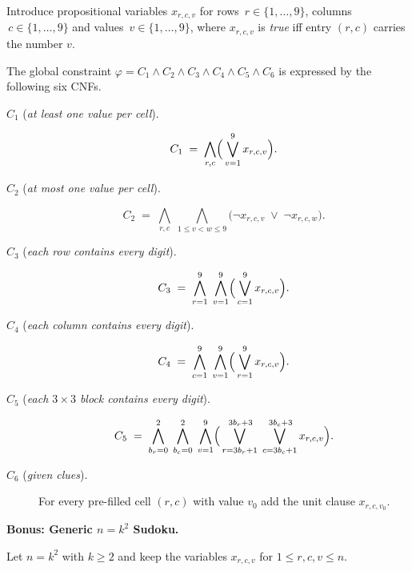 \documentclass{article}
\theoremstyle{theorem}
\theoremstyle{definition}
\theoremstyle{remark}
\begin{document}
Introduce propositional variables $x_{r,c,v}$ for rows $\,r\in\{1,\dots,9\}$,
columns $\,c\in\{1,\dots,9\}$ and values $\,v\in\{1,\dots,9\}$, where
$x_{r,c,v}$ is \emph{true} iff entry $(r,c)$ carries the number $v$.

The global constraint
$\varphi = C_1 \land C_2 \land C_3 \land C_4 \land C_5 \land C_6$
is expressed by the following six CNFs.

\begin{description}
  \item[$C_1$ (\emph{at least one value per cell}).]
        \[
          C_1 \;=\; \bigwedge_{r,c}\Bigl(\,\bigvee_{v=1}^{9} x_{r,c,v}\Bigr).
        \]

  \item[$C_2$ (\emph{at most one value per cell}).]
        \[
          C_2 \;=\; \bigwedge_{r,c}\;
                     \bigwedge_{1 \le v < w \le 9}
                     \bigl(\neg x_{r,c,v}\;\lor\;\neg x_{r,c,w}\bigr).
        \]

  \item[$C_3$ (\emph{each row contains every digit}).]
        \[
          C_3 \;=\; \bigwedge_{r=1}^{9}\;
                     \bigwedge_{v=1}^{9}
                     \Bigl(\,\bigvee_{c=1}^{9} x_{r,c,v}\Bigr).
        \]

  \item[$C_4$ (\emph{each column contains every digit}).]
        \[
          C_4 \;=\; \bigwedge_{c=1}^{9}\;
                     \bigwedge_{v=1}^{9}
                     \Bigl(\,\bigvee_{r=1}^{9} x_{r,c,v}\Bigr).
        \]

  \item[$C_5$ (\emph{each $3\times3$ block contains every digit}).]
        \[
          C_5 \;=\; \bigwedge_{b_r = 0}^{2}\;
                     \bigwedge_{b_c = 0}^{2}\;
                     \bigwedge_{v=1}^{9}
                     \Bigl(\,
                        \bigvee_{r = 3b_r + 1}^{\,3b_r + 3}
                        \;\bigvee_{c = 3b_c + 1}^{\,3b_c + 3}
                        x_{r,c,v}\Bigr).
        \]

  \item[$C_6$ (\emph{given clues}).]
        For every pre-filled cell $(r,c)$ with value $v_0$ add the unit clause $x_{r,c,v_0}$.
\end{description}

\medskip
\medskip
\textbf{Bonus: Generic $n=k^{2}$ Sudoku.}

Let $n=k^{2}$ with $k\ge 2$ and keep the variables
$x_{r,c,v}$ for $1\le r,c,v\le n$.
\end{document}
